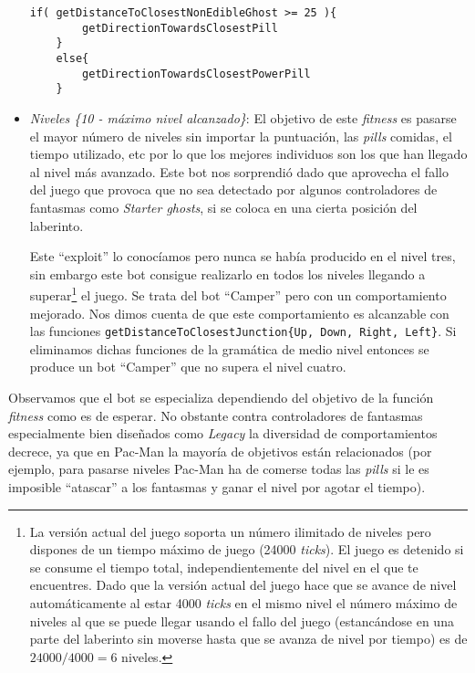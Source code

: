\begin{itemize}
\begin{lstlisting}[caption={Mejor individuo obtenido mediante esta función fitness.}]
    if( getDistanceToClosestNonEdibleGhost >= 25 ){ 
        getDirectionTowardsClosestPill
    }
    else{ 
        getDirectionTowardsClosestPowerPill
    }
\end{lstlisting}

\item \textit{Niveles \{10 - máximo nivel alcanzado\}}: El objetivo de este \textit{fitness} es pasarse el mayor número de niveles sin importar la puntuación, las \textit{pills} comidas, el tiempo utilizado, etc por lo que los mejores individuos son los que han llegado al nivel más avanzado. Este bot nos sorprendió dado que aprovecha el fallo del juego que provoca que no sea detectado por algunos controladores de fantasmas como \textit{Starter ghosts}, si se coloca en una cierta posición del laberinto.

Este ``exploit'' lo conocíamos pero nunca se había producido en el nivel tres, sin embargo este bot consigue realizarlo en todos los niveles llegando a superar\footnote{La versión actual del juego soporta un número ilimitado de niveles pero dispones de un tiempo máximo de juego (24000 \textit{ticks}). El juego es detenido si se consume el tiempo total, independientemente del nivel en el que te encuentres. Dado que la versión actual del juego hace que se avance de nivel automáticamente al estar 4000 \textit{ticks} en el mismo nivel el número máximo de niveles al que se puede llegar usando el fallo del juego (estancándose en una parte del laberinto sin moverse hasta que se avanza de nivel por tiempo) es de $24000 / 4000 = 6$ niveles.} el juego. Se trata del bot ``Camper'' pero con un comportamiento mejorado. Nos dimos cuenta de que este comportamiento es alcanzable con las funciones \texttt{getDistanceToClosestJunction\{Up, Down, Right, Left\}}. Si eliminamos dichas funciones de la gramática de medio nivel entonces se produce un bot ``Camper'' que no supera el nivel cuatro.
\end{itemize}

Observamos que el bot se especializa dependiendo del objetivo de la función \textit{fitness} como es de esperar. No obstante contra controladores de fantasmas especialmente bien diseñados como \textit{Legacy} la diversidad de comportamientos decrece, ya que en Pac-Man la mayoría de objetivos están relacionados (por ejemplo, para pasarse niveles Pac-Man ha de comerse todas las \textit{pills} si le es imposible ``atascar'' a los fantasmas y ganar el nivel por agotar el tiempo).

